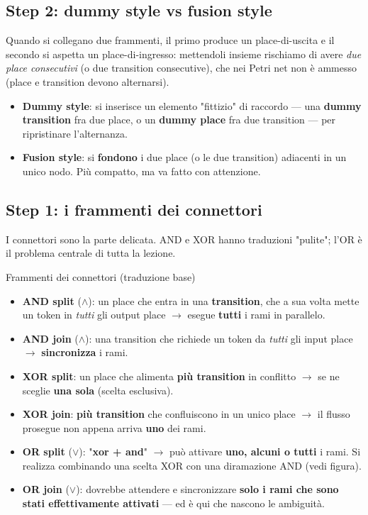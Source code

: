 \subsection{\texorpdfstring{Step 2: dummy style vs fusion style}{Step 2: dummy style vs fusion style}}

Quando si collegano due frammenti, il primo produce un place-di-uscita e il secondo si aspetta un place-di-ingresso: mettendoli insieme rischiamo di avere \emph{due place consecutivi} (o due transition consecutive), che nei Petri net non è ammesso (place e transition devono alternarsi).

\begin{itemize}
\item \textbf{Dummy style}: si inserisce un elemento "fittizio" di raccordo — una \textbf{dummy transition} fra due place, o un \textbf{dummy place} fra due transition — per ripristinare l'alternanza.
\item \textbf{Fusion style}: si \textbf{fondono} i due place (o le due transition) adiacenti in un unico nodo. Più compatto, ma va fatto con attenzione.
\end{itemize}

\subsection{\texorpdfstring{Step 1: i frammenti dei connettori}{Step 1: i frammenti dei connettori}}

I connettori sono la parte delicata. AND e XOR hanno traduzioni "pulite"; l'OR è il problema centrale di tutta la lezione.

\begin{boxdefinition}{Frammenti dei connettori (traduzione base)}
\begin{itemize}
\item \textbf{AND split} ($\wedge$): un place che entra in una \textbf{transition}, che a sua volta mette un token in \emph{tutti} gli output place $\rightarrow$ esegue \textbf{tutti} i rami in parallelo.
\item \textbf{AND join} ($\wedge$): una transition che richiede un token da \emph{tutti} gli input place $\rightarrow$ \textbf{sincronizza} i rami.
\item \textbf{XOR split}: un place che alimenta \textbf{più transition} in conflitto $\rightarrow$ se ne sceglie \textbf{una sola} (scelta esclusiva).
\item \textbf{XOR join}: \textbf{più transition} che confluiscono in un unico place $\rightarrow$ il flusso prosegue non appena arriva \textbf{uno} dei rami.
\item \textbf{OR split} ($\vee$): "\textbf{xor + and}" $\rightarrow$ può attivare \textbf{uno, alcuni o tutti} i rami. Si realizza combinando una scelta XOR con una diramazione AND (vedi figura).
\item \textbf{OR join} ($\vee$): dovrebbe attendere e sincronizzare \textbf{solo i rami che sono stati effettivamente attivati} — ed è qui che nascono le ambiguità.
\end{itemize}
\end{boxdefinition}

